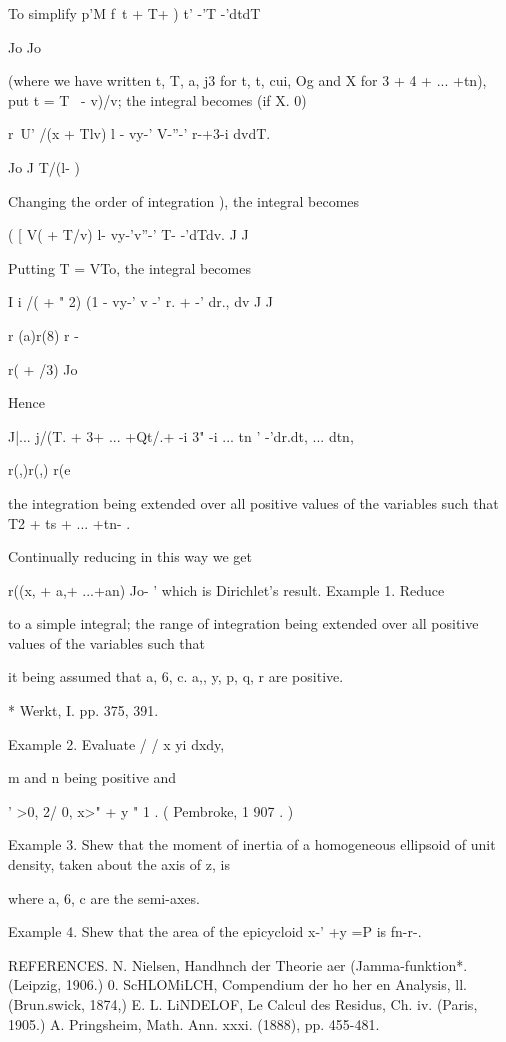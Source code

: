 To simplify p'M f\ t + T+ ) t' -'T -'dtdT

Jo Jo

(where we have written t, T, a, j3 for t, t, cui, Og and X for 3 + 4
+ ... +tn), put t = T \ - v)/v; the integral becomes (if X. 0)

r~U' /(x + Tlv) l - vy-' V-''-' r-+3-i dvdT.

Jo J T/(l- )

Changing the order of integration ), the integral becomes

( [ V( + T/v) l- vy-'v''-' T- -'dTdv. J J

Putting T = VTo, the integral becomes

I i /( + " 2) (1 - vy-' v -' r. + -' dr., dv J J

r (a)r(8) r -

r( + /3) Jo

Hence

  J|... j/(T. + 3+ ... +Qt/.+ -i 3" -i ... tn ' -'dr.dt, ... dtn,

r(,)r(,) r(e

the integration being extended over all positive values of the
variables such that T2 + ts + ... +tn- .

Continually reducing in this way we get

r((x, + a,+ ...+an) Jo- ' which is Dirichlet's result. Example 1.
Reduce

to a simple integral; the range of integration being extended over
all positive values of the variables such that

it being assumed that a, 6, c. a,, y, p, q, r are positive.

* Werkt, I. pp. 375, 391.

%
%

Example 2. Evaluate / / x yi dxdy,

m and n being positive and

' >0, 2/ 0, x>" + y " 1 . ( Pembroke, 1 907 . )

Example 3. Shew that the moment of inertia of a homogeneous ellipsoid
of unit density, taken about the axis of z, is

where a, 6, c are the semi-axes.

Example 4. Shew that the area of the epicycloid x-' +y =P is fn-r-.

REFERENCES. N. Nielsen, Handhnch der Theorie aer (Jamma-funktion*.
(Leipzig, 1906.) 0. ScHLOMiLCH, Compendium der ho her en Analysis, ll.
(Brun.swick, 1874,) E. L. LiNDELOF, Le Calcul des Residus, Ch. iv.
(Paris, 1905.) A. Pringsheim, Math. Ann. xxxi. (1888), pp. 455-481.

